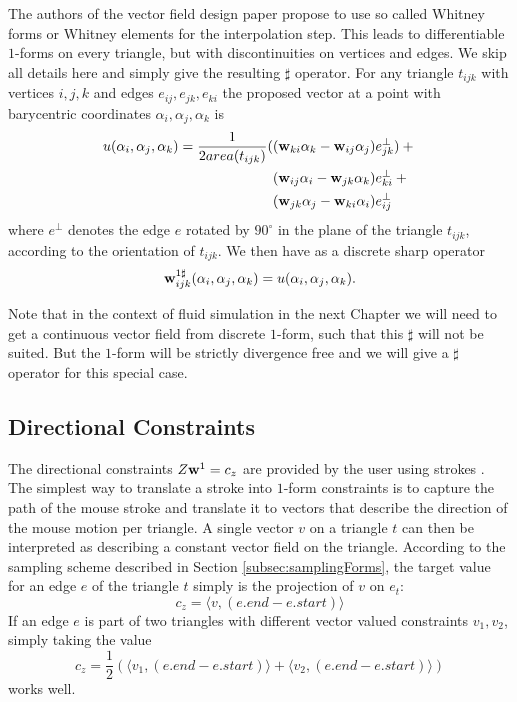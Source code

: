The authors of the vector field design paper  propose to use so called Whitney forms or Whitney elements for the interpolation step. This leads to differentiable $1$-forms on every triangle, but with discontinuities on vertices and edges. We skip all details here and simply give the resulting $\sharp$ operator. For any triangle $t_{ijk}$ with vertices $i,j,k$ and edges $e_{ij}, e_{jk},e_{ki}$ the proposed vector at a point with barycentric coordinates $\alpha_i, \alpha_j, \alpha_k$ is
\begin{align} u(\alpha_i, \alpha_j, \alpha_k) = \frac{1}{2area(t_{ijk})} ( &(\textbf{w}_{ki} \alpha_k - \textbf{w}_{ij} \alpha_j)e_{jk}^\perp ) + {}\nonumber\\
&(\textbf{w}_{ij} \alpha_i - \textbf{w}_{jk} \alpha_k)e_{ki}^\perp + {}\nonumber\\ 
&(\textbf{w}_{jk} \alpha_j - \textbf{w}_{ki} \alpha_i)e_{ij}^\perp
\label{eq:vfSharp}
\end{align}
where $e^\perp$ denotes the edge $e$ rotated by $90^\circ$ in the plane of the triangle $t_{ijk}$, according to the orientation of $t_{ijk}$. We then have as a discrete sharp operator
$$\textbf{w}^{1\sharp}_{ijk}(\alpha_i, \alpha_j, \alpha_k) = u(\alpha_i, \alpha_j, \alpha_k).$$

Note that in the context of fluid simulation in the next Chapter we will need to get a continuous vector field from discrete $1$-form, such that this $\sharp$ will not be suited. But the $1$-form will be strictly divergence free and we will give a $\sharp$ operator for this special case.


\subsection{Directional Constraints}
The directional constraints $Z \textbf{w}^1 = c_z$ are provided by the user using strokes . The simplest way to translate a stroke into $1$-form constraints is to capture the path of the mouse stroke and translate it to vectors that describe the direction of the mouse motion per triangle.
A single vector $v$ on a triangle $t$ can then be interpreted as describing a constant vector field on the triangle. According to the sampling scheme described in Section \ref{subsec:samplingForms}, the target value for an edge $e$ of the triangle $t$ simply is the projection of $v$ on $e_t$:
$$c_z = \langle v, (e.end - e.start) \rangle$$
If an edge $e$ is part of two triangles with different vector valued constraints $v_1,v_2$, simply taking the value
\[c_z= \frac{1}{2}\left(\langle v_1, (e.end - e.start) \rangle + \langle v_2, (e.end - e.start) \rangle\right)\]
works well.

